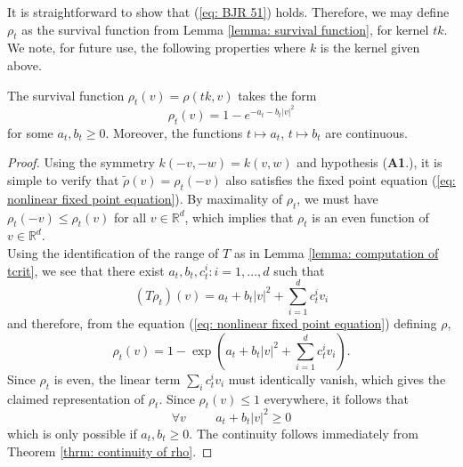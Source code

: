 It is straightforward to show that (\ref{eq: BJR 51}) holds. Therefore, we may define $\rho_t$ as the survival function from Lemma \ref{lemma: survival function}, for kernel $tk$. We note, for future use, the following properties where $k$ is the kernel given above.
\begin{lemma}\label{lemma: form of rho-t}
    The survival function $\rho_t(v)=\rho(tk,v)$ takes the form \begin{equation}
        \rho_t(v)=1-e^{-a_t-b_t|v|^2}
    \end{equation} for some $a_t, b_t \ge 0$. Moreover, the functions $t\mapsto a_t$, $t\mapsto b_t$ are continuous.
\end{lemma}
\begin{proof} Using the symmetry $k(-v,-w)=k(v,w)$ and hypothesis (\textbf{A1}.), it is simple to verify that $\tilde{\rho}(v)=\rho_t(-v)$ also satisfies the fixed point equation (\ref{eq: nonlinear fixed point equation}). By maximality of $\rho_t$, we must have $\rho_t(-v)\le \rho_t(v)$ for all $v\in \mathbb{R}^d$, which implies that $\rho_t$ is an even function of $v\in\mathbb{R}^d$. \medskip \\ Using the identification of the range of $T$ as in Lemma \ref{lemma: computation of tcrit}, we see that there exist $a_t, b_t, c^i_t: i=1, ..., d$ such that \begin{equation}
    (T\rho_t)(v)=a_t+b_t|v|^2+\sum_{i=1}^d c^i_t v_i
\end{equation}and therefore, from the equation (\ref{eq: nonlinear fixed point equation}) defining $\rho$, \begin{equation}
    \rho_t(v)=1-\exp\left(a_t+b_t|v|^2+\sum_{i=1}^d c^i_t v_i\right).
\end{equation} Since $\rho_t$ is even, the linear term $\sum_i c^i_t v_i$ must identically vanish, which gives the claimed representation of $\rho_t$. Since $\rho_t(v)\le 1$ everywhere, it follows that \begin{equation}
   \forall v \hspace{1cm} a_t+b_t|v|^2 \ge 0
\end{equation}which is only possible if $a_t, b_t\ge 0.$ The continuity follows immediately from Theorem \ref{thrm: continuity of rho}. \end{proof} 
